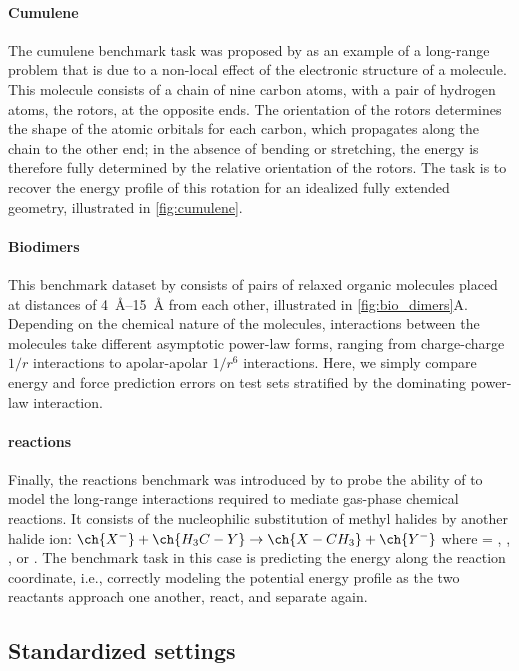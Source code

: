 \documentclass[10pt]{article} %
\begin{document}
\paragraph{Cumulene} The cumulene benchmark task was proposed by \cite{ucsgpstm2021} as an example of a long-range problem that is due to a non-local effect of the electronic structure of a molecule. This molecule consists of a chain of nine carbon atoms, with a pair of hydrogen atoms, the rotors, at the opposite ends. The orientation of the rotors determines the shape of the atomic orbitals for each carbon, which propagates along the chain to the other end; in the absence of bending or stretching, the energy is therefore fully determined by the relative orientation of the rotors. The task is to recover the energy profile of this rotation for an idealized fully extended geometry, illustrated in \cref{fig:cumulene}.

\paragraph{Biodimers} This benchmark dataset by \cite{hlhc2023} consists of pairs of relaxed organic molecules placed at distances of \qtyrange{4}{15}{\angstrom} from each other, illustrated in \cref{fig:bio_dimers}A. Depending on the chemical nature of the molecules, interactions between the molecules take different asymptotic power-law forms, ranging from charge-charge $1/r$ interactions to apolar-apolar $1/r^6$ interactions. Here, we simply compare energy and force prediction errors on test sets stratified by the dominating power-law interaction.

\paragraph{\sn reactions} Finally, the \sn reactions benchmark was introduced by \cite{fcmu2024} to probe the ability of \mlps to model the long-range interactions required to mediate gas-phase chemical reactions. It consists of the nucleophilic substitution of methyl halides by another halide ion: $\ch{X^-} + \ch{H_3C-Y} \rightarrow \ch{X-CH_3} + \ch{Y^-}$ where  = , , , or . The benchmark task in this case is predicting the energy along the reaction coordinate, i.e., correctly modeling the potential energy profile as the two reactants approach one another, react, and separate again.



\subsection{Standardized settings}
\label{sub:default}
\end{document}
